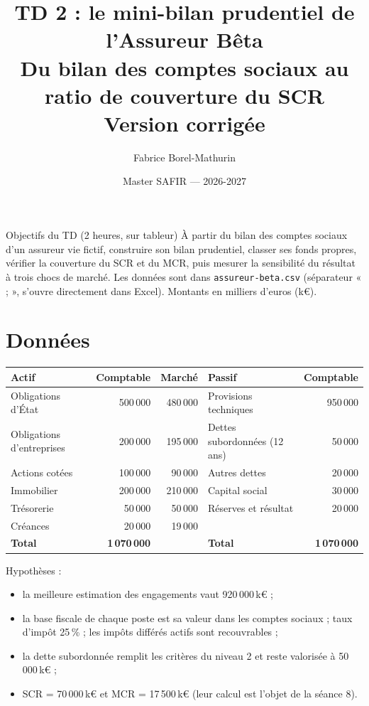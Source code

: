 \documentclass[11pt,a4paper]{article}
\title{\vspace{-1.5cm}\sffamily\bfseries\color{bleuactu}
       TD 2 : le mini-bilan prudentiel de l'Assureur Bêta\\[2mm]
       \large\mdseries\color{black}Du bilan des comptes sociaux au ratio de couverture du SCR
       \ifcorrection\\[1mm]\color{vertactu}Version corrigée\fi}
\author{\sffamily Fabrice Borel-Mathurin}
\date{\sffamily\small Master SAFIR --- 2026-2027}
\newcommand{\keur}{\,k\euro}
\begin{document}
\maketitle
\thispagestyle{empty}

\begin{notion}{Objectifs du TD (2 heures, sur tableur)}
À partir du bilan des comptes sociaux d'un assureur vie fictif, construire son bilan prudentiel,
classer ses fonds propres, vérifier la couverture du SCR et du MCR, puis mesurer la sensibilité du
résultat à trois chocs de marché. Les données sont dans \texttt{assureur-beta.csv} (séparateur
« ; », s'ouvre directement dans Excel). Montants en milliers d'euros (k\euro).
\end{notion}

\section{Données}

\begin{center}
\small
\begin{tabular}{lrr@{\qquad}lr}
\toprule
\textbf{Actif} & \textbf{Comptable} & \textbf{Marché} & \textbf{Passif} & \textbf{Comptable} \\
\midrule
Obligations d'État        & 500\,000 & 480\,000 & Provisions techniques       & 950\,000 \\
Obligations d'entreprises & 200\,000 & 195\,000 & Dettes subordonnées (12 ans) & 50\,000 \\
Actions cotées            & 100\,000 &  90\,000 & Autres dettes               &  20\,000 \\
Immobilier                & 200\,000 & 210\,000 & Capital social              &  30\,000 \\
Trésorerie                &  50\,000 &  50\,000 & Réserves et résultat        &  20\,000 \\
Créances                  &  20\,000 &  19\,000 &                             &          \\
\midrule
\textbf{Total}            & \textbf{1\,070\,000} & & \textbf{Total} & \textbf{1\,070\,000} \\
\bottomrule
\end{tabular}
\end{center}

\noindent Hypothèses :
\begin{itemize}[nosep]
  \item la meilleure estimation des engagements vaut 920\,000\keur{} ;
  \item la base fiscale de chaque poste est sa valeur dans les comptes sociaux ; taux d'impôt 25\,\% ;
        les impôts différés actifs sont recouvrables ;
  \item la dette subordonnée remplit les critères du niveau 2 et reste valorisée à 50\,000\keur{} ;
  \item SCR = 70\,000\keur{} et MCR = 17\,500\keur{} (leur calcul est l'objet de la séance 8).
\end{itemize}
\end{document}

